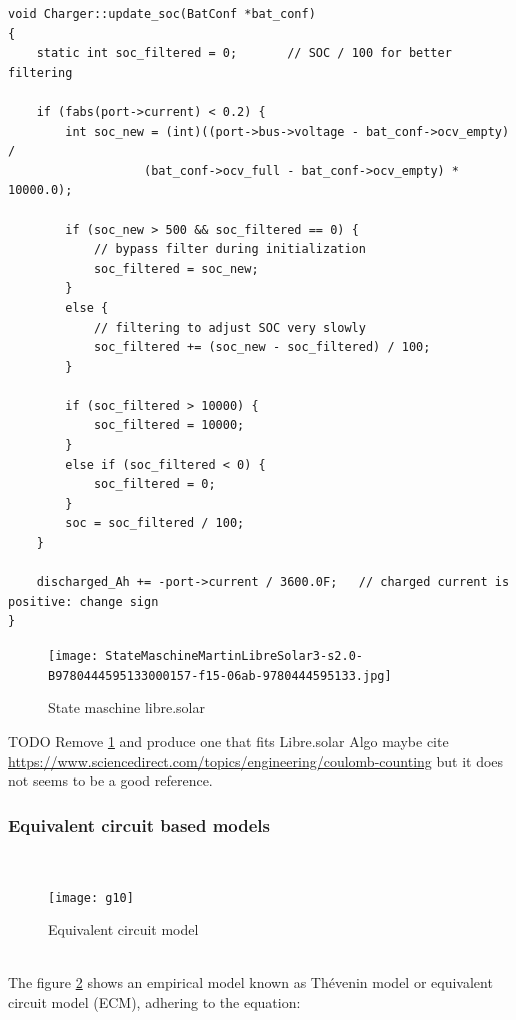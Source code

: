 \begin{verbatim}
void Charger::update_soc(BatConf *bat_conf)
{
    static int soc_filtered = 0;       // SOC / 100 for better filtering

    if (fabs(port->current) < 0.2) {
        int soc_new = (int)((port->bus->voltage - bat_conf->ocv_empty) /
                   (bat_conf->ocv_full - bat_conf->ocv_empty) * 10000.0);

        if (soc_new > 500 && soc_filtered == 0) {
            // bypass filter during initialization
            soc_filtered = soc_new;
        }
        else {
            // filtering to adjust SOC very slowly
            soc_filtered += (soc_new - soc_filtered) / 100;
        }

        if (soc_filtered > 10000) {
            soc_filtered = 10000;
        }
        else if (soc_filtered < 0) {
            soc_filtered = 0;
        }
        soc = soc_filtered / 100;
    }

    discharged_Ah += -port->current / 3600.0F;   // charged current is positive: change sign
}
\end{verbatim}



\begin{figure}
\centering
\texttt{[image: StateMaschineMartinLibreSolar3-s2.0-B9780444595133000157-f15-06ab-9780444595133.jpg]}
\caption{\label{fig:StateMaschineMartinLibreSolar3} State maschine libre.solar}
\end{figure}
TODO Remove \ref{fig:StateMaschineMartinLibreSolar3}  and produce one that fits Libre.solar Algo maybe cite \url{https://www.sciencedirect.com/topics/engineering/coulomb-counting}  but it does not seems to be a good reference. 



\pagebreak

\subsubsection{Equivalent circuit based models}
\label{section:Equivalentcircuitbasedmodels}
\
\
\
\begin{figure}[h!]
\begin{center}
\texttt{[image: g10]} %
\caption{\label{fig:ECMThevinModel} Equivalent circuit model }
\end{center} 
\end{figure} 
 \\
The figure \ref{fig:ECMThevinModel} shows an empirical model known as Thévenin model or equivalent circuit model (ECM), adhering to the equation: 

